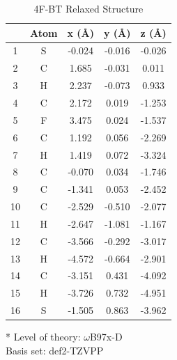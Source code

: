 \begin{table}[hbt!]\centering
\caption{4F-BT Relaxed Structure}
\renewcommand{\arraystretch}{1.5}
\begin{threeparttable}
\begin{tabular}{ccccc}\toprule
{} & {Atom} & {x (\AA)} & {y (\AA)} & {z (\AA)} \\ \midrule
1 & S & -0.024 & -0.016 & -0.026\\
2 & C & 1.685 & -0.031 & 0.011\\
3 & H & 2.237 & -0.073 & 0.933\\
4 & C & 2.172 & 0.019 & -1.253\\
5 & F & 3.475 & 0.024 & -1.537\\
6 & C & 1.192 & 0.056 & -2.269\\
7 & H & 1.419 & 0.072 & -3.324\\
8 & C & -0.070 & 0.034 & -1.746\\
9 & C & -1.341 & 0.053 & -2.452\\
10 & C & -2.529 & -0.510 & -2.077\\
11 & H & -2.647 & -1.081 & -1.167\\
12 & C & -3.566 & -0.292 & -3.017\\
13 & H & -4.572 & -0.664 & -2.901\\
14 & C & -3.151 & 0.431 & -4.092\\
15 & H & -3.726 & 0.732 & -4.951\\
16 & S & -1.505 & 0.863 & -3.962\\ \bottomrule
\end{tabular}
\begin{tablenotes}
\item[*] \footnotesize Level of theory: $\omega$B97x-D \\ Basis set: def2-TZVPP
\end{tablenotes}
\end{threeparttable}
\end{table}
